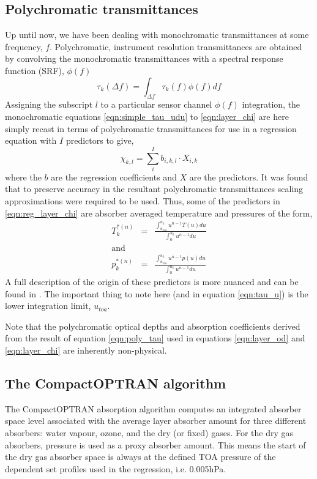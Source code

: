 \subsection{Polychromatic transmittances}
Up until now, we have been dealing with monochromatic transmittances at some frequency, $f$. Polychromatic, instrument resolution transmittances are obtained by convolving the monochromatic transmittances with a spectral response function (SRF), $\phi(f)$
\begin{equation}
  \tau_{k}(\Delta{f}) = \int_{\Delta{f}}\tau_{k}(f)\phi(f)df
  \label{eqn:poly_tau}
\end{equation}
Assigning the subscript $l$ to a particular sensor channel $\phi(f)$ integration, the monochromatic equations \ref{eqn:simple_tau_udu} to \ref{eqn:layer_chi} are here simply recast in terms of polychromatic transmittances for use in a regression equation with $I$ predictors to give,
\begin{equation}
  \chi_{k,l} = \sum_{i}^{I}b_{i,k,l}\cdot X_{i,k}
  \label{eqn:reg_layer_chi}
\end{equation}
where the $b$ are the regression coefficients and $X$ are the predictors. It was found\cite{ref:optran1}\cite{ref:optran3} that to preserve accuracy in the resultant polychromatic transmittances scaling approximations were required to be used. Thus, some of the predictors in \ref{eqn:reg_layer_chi} are absorber averaged temperature and pressures of the form,
\begin{eqnarray}
  T_{k}^{*(n)} & = & \frac{\displaystyle\int_{u_{toa}}^{u_{k}}u^{n-1}T(u)du}{\displaystyle\int_{0}^{u_{k}}u^{n-1}du}\nonumber\\
  \textrm{and} & &\\
  p_{k}^{*(n)} & = & \frac{\displaystyle\int_{u_{toa}}^{u_{k}}u^{n-1}p(u)du}{\displaystyle\int_{0}^{u_{k}}u^{n-1}du}\nonumber
\end{eqnarray}
A full description of the origin of these predictors is more nuanced and can be found in \cite{ref:optran3}. The important thing to note here (and in equation \ref{eqn:tau_u}) is the lower integration limit, $u_{toa}$.

Note that the polychromatic optical depths and absorption coefficients derived from the result of equation \ref{eqn:poly_tau} used in equations \ref{eqn:layer_od} and \ref{eqn:layer_chi} are inherently non-physical.


\subsection{The CompactOPTRAN algorithm}
\label{sec:compact_optran}
The CompactOPTRAN absorption algorithm computes an integrated absorber space level associated with the average layer absorber amount for three different absorbers: water vapour, ozone, and the dry (or fixed) gases. For the dry gas absorbers, pressure is used as a proxy absorber amount. This means the start of the dry gas absorber space is always at the defined TOA pressure of the dependent set profiles used in the regression, i.e. 0.005hPa.

